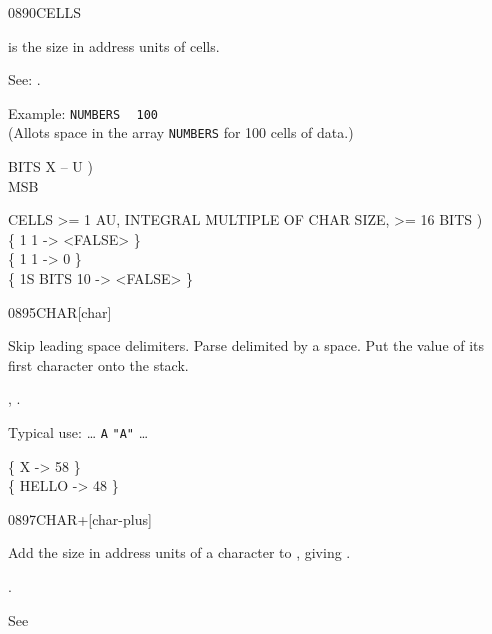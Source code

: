 \begin{worddef}{0890}{CELLS}
\item {}

	 is the size in address units of  cells.

	\begin{defer}
	\rationale %
		See: .

		Example:
			 \texttt{NUMBERS} ~
			\texttt{100}   \\
		(Allots space in the array \texttt{NUMBERS} for 100 cells
		of data.)

	\testing
		\word{:} BITS  X -- U ) \\
		      MSB 
			       
		\word{;}

		 CELLS >= 1 AU, INTEGRAL MULTIPLE OF CHAR SIZE, >= 16 BITS ) \\
		\{ 1  1  -> <FALSE> \} \\
		\{ 1  1   -> 0 \} \\
		\{ 1S BITS 10  -> <FALSE> \}
	\end{defer}
\end{worddef}


\begin{worddef}{0895}{CHAR}[char]
\item {}

	Skip leading space delimiters. Parse  delimited by
	a space. Put the value of its first character onto the stack.

\see {},
	\wref{core:[CHAR]}{[CHAR]}.

	\begin{defer}
	\rationale %
		Typical use: {\ldots}
			 \texttt{A}  \texttt{"A"} {\ldots}

	\testing
		\{  X     -> 58 \} \\
		\{  HELLO -> 48 \}
	\end{defer}
\end{worddef}


\begin{worddef}{0897}{CHAR+}[char-plus]
\item {}

	Add the size in address units of a character to
	, giving \param{c-addr_2}.

\see {}.

	\begin{defer}
	\testing*
		See \rref{core:C,}{C,}
	\end{defer}
\end{worddef}


